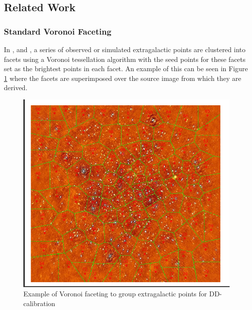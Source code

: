 \subsection{Related Work}\label{ra:sec:rw}
%
\subsubsection{Standard Voronoi Faceting}\label{ra:ssec:svf}
In \citet{tasse2014applying}, \citet{smirnov2015radio} and \citet{van2016lofar}, a series of observed or simulated extragalactic points are clustered into facets using a Voronoi tessellation algorithm with the seed points for these facets set as the brightest points in each facet. An example of this can be seen in Figure \ref{tes:fig:stelvor} where the facets are superimposed over the source image from which they are derived.
%
\begin{figure}[H]
    \centering
    \includegraphics[scale=0.4]{Images/tessellation.png}
    \caption{Example of Voronoi faceting to group extragalactic points for DD-calibration}
    \label{tes:fig:stelvor}
\end{figure}
